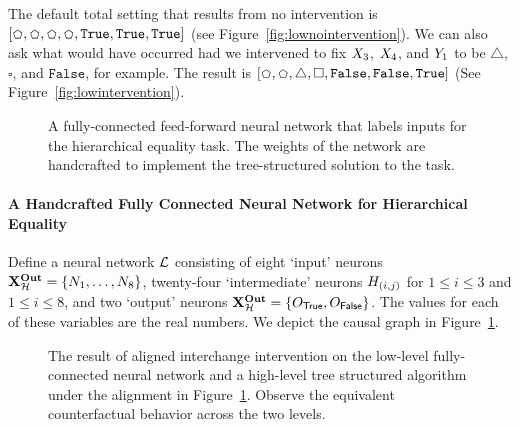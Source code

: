 \documentclass[twoside,11pt]{article}
\begin{document}
The default total setting that results from no intervention is $[\pentagon,\pentagon,\pentagon,\pentagon,\normalsize\texttt{True}, \texttt{True}, \texttt{True}]$ (see Figure~\ref{fig:lownointervention}). We can also ask what would have occurred had we intervened to fix $X_3$, $X_4$, and $Y_1$ to be $\bigtriangleup$, $\square$, and $\texttt{False}$, for example. The result is $[\pentagon,\pentagon,\bigtriangleup,\square\normalsize, \texttt{False}, \texttt{False}, \texttt{True}]$ (See Figure~\ref{fig:lowintervention}). 

\begin{figure}
    \centering
    \resizebox{0.8\textwidth}{!}{
    
    \vspace{10pt}
    }
    
    \caption{A fully-connected feed-forward neural network that labels inputs for the hierarchical equality task. The weights of the network are handcrafted to implement the tree-structured solution to the task.}
    \label{fig:hand}
\end{figure}


\paragraph{A Handcrafted Fully Connected Neural Network for Hierarchical Equality}
Define a neural network $\mathcal{L}$ consisting of eight `input' neurons $\mathbf{X}^{\mathbf{Out}}_{\mathcal{H}} = \{N_1, \dots, N_8\}$, twenty-four `intermediate' neurons $H_{(i,j)}$ for $1 \leq i \leq 3$ and $1 \leq i \leq 8$, and two `output' neurons $\mathbf{X}^{\mathbf{Out}}_{\mathcal{H}} = \{O_{\mathsf{True}},O_{\mathsf{False}}\}$. The values for each of these variables are the real numbers. We depict the causal graph in Figure~\ref{fig:hand}.



    \begin{figure}[tp]
    
  \hspace{1em}\resizebox{0.97\textwidth}{!}{ 
                      
                      }
    \caption{The result of aligned interchange intervention on the low-level fully-connected neural network and a high-level tree structured algorithm under the alignment in Figure~\ref{fig:hand}. Observe the equivalent counterfactual behavior across the two levels.}
    \label{fig:interchange}
    \end{figure}
\end{document}
